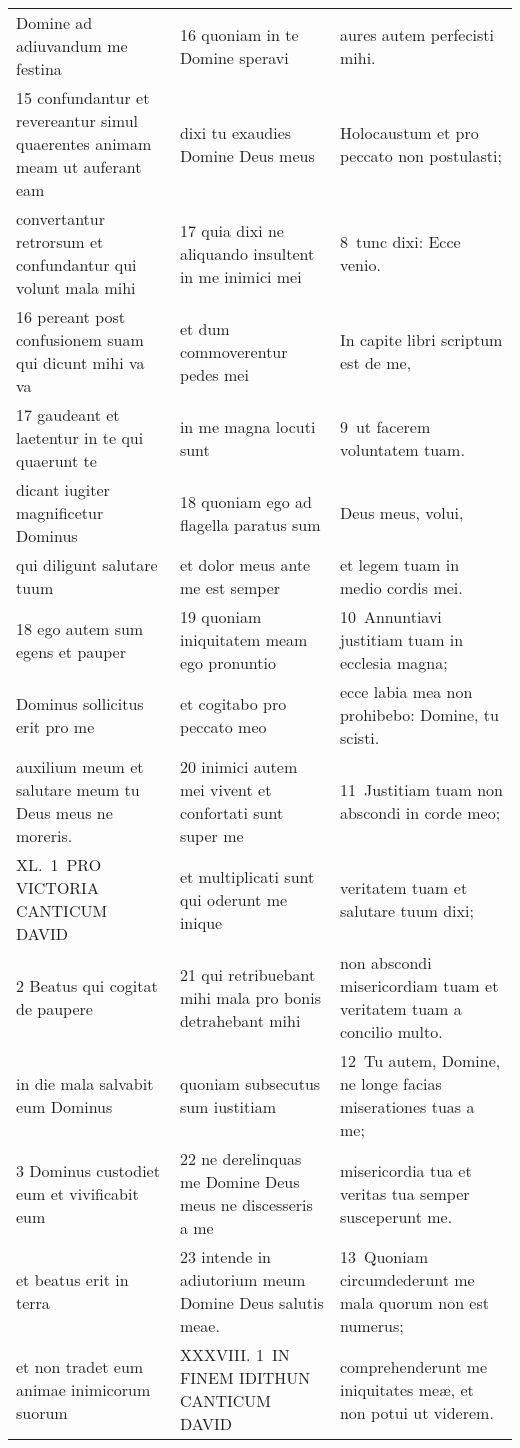 \documentclass{article}
\begin{document}
\begin{longtable}{@{}p{}p{}p{}@{}}
Domine ad adiuvandum me festina	&	16 quoniam in te Domine speravi	&	aures autem perfecisti mihi.	\\
15 confundantur et revereantur simul quaerentes animam meam ut auferant eam	&	dixi tu exaudies Domine Deus meus	&	Holocaustum et pro peccato non postulasti;	\\
convertantur retrorsum et confundantur qui volunt mala mihi	&	17 quia dixi ne aliquando insultent in me inimici mei	&	8 tunc dixi: Ecce venio.	\\
16 pereant post confusionem suam qui dicunt mihi va va	&	et dum commoverentur pedes mei	&	In capite libri scriptum est de me,	\\
17 gaudeant et laetentur in te qui quaerunt te	&	in me magna locuti sunt	&	9 ut facerem voluntatem tuam.	\\
dicant iugiter magnificetur Dominus	&	18 quoniam ego ad flagella paratus sum	&	Deus meus, volui,	\\
qui diligunt salutare tuum	&	et dolor meus ante me est semper	&	et legem tuam in medio cordis mei.	\\
18 ego autem sum egens et pauper	&	19 quoniam iniquitatem meam ego pronuntio	&	10 Annuntiavi justitiam tuam in ecclesia magna;	\\
Dominus sollicitus erit pro me	&	et cogitabo pro peccato meo	&	ecce labia mea non prohibebo: Domine, tu scisti.	\\
auxilium meum et salutare meum tu Deus meus ne moreris.	&	20 inimici autem mei vivent et confortati sunt super me	&	11 Justitiam tuam non abscondi in corde meo;	\\
XL. 1 PRO VICTORIA CANTICUM DAVID	&	et multiplicati sunt qui oderunt me inique	&	veritatem tuam et salutare tuum dixi;	\\
2 Beatus qui cogitat de paupere	&	21 qui retribuebant mihi mala pro bonis detrahebant mihi	&	non abscondi misericordiam tuam et veritatem tuam a concilio multo.	\\
in die mala salvabit eum Dominus	&	quoniam subsecutus sum iustitiam	&	12 Tu autem, Domine, ne longe facias miserationes tuas a me;	\\
3 Dominus custodiet eum et vivificabit eum	&	22 ne derelinquas me Domine Deus meus ne discesseris a me	&	misericordia tua et veritas tua semper susceperunt me.	\\
et beatus erit in terra	&	23 intende in adiutorium meum Domine Deus salutis meae.	&	13 Quoniam circumdederunt me mala quorum non est numerus;	\\
et non tradet eum animae inimicorum suorum	&	XXXVIII. 1 IN FINEM IDITHUN CANTICUM DAVID	&	comprehenderunt me iniquitates meæ, et non potui ut viderem.	\\

\end{longtable}
\end{document}
